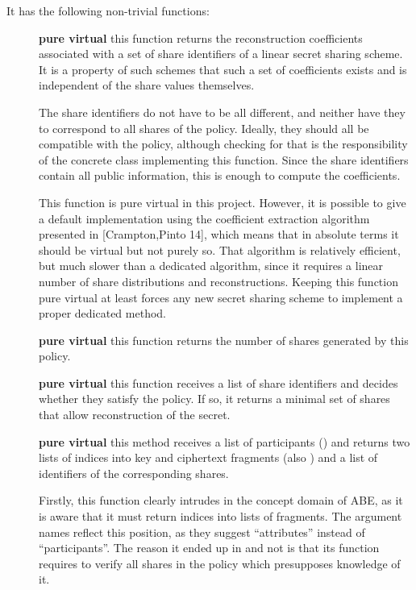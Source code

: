 \documentclass{article}
\begin{document}
It has the following non-trivial functions:
\begin{description}
\item[] {\bf pure virtual} this function returns the reconstruction coefficients associated with a set of share identifiers of a linear secret sharing scheme. It is a property of such schemes that such a set of coefficients exists and is independent of the share values themselves.

The share identifiers do not have to be all different, and neither have they to correspond to all shares of the policy. Ideally, they should all be compatible with the policy, although checking for that is the responsibility of the concrete class implementing this function. Since the share identifiers contain all public information, this is enough to compute the coefficients.

This function is pure virtual in this project. However, it is possible to give a default implementation using the coefficient extraction algorithm presented in [Crampton,Pinto 14], which means that in absolute terms it should be virtual but not purely so. That algorithm is relatively efficient, but much slower than a dedicated algorithm, since it requires a linear number of share distributions and reconstructions. Keeping this function pure virtual at least forces any new secret sharing scheme to implement a proper dedicated method. 

\item[] {\bf pure virtual} this function returns the number of shares generated by this policy.
\item[] {\bf pure virtual} this function receives a list of share identifiers and decides whether they satisfy the policy. If so, it returns a minimal set of shares that allow reconstruction of the secret.
\item[] {\bf pure virtual} this method receives a list of participants () and returns two lists of indices into key and ciphertext fragments (also ) and a list of identifiers of the corresponding shares.

Firstly, this function clearly intrudes in the concept domain of ABE, as it is aware that it must return indices into lists of fragments. The argument names reflect this position, as they suggest ``attributes'' instead of ``participants''. The reason it ended up in \cAP and not \cKPABE is that its function requires to verify all shares in the policy which presupposes knowledge of it.


\end{description}
\end{document}
